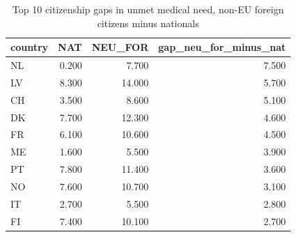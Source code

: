 \begin{table}
\caption{Top 10 citizenship gaps in unmet medical need, non-EU foreign citizens minus nationals}
\label{tab:citizenship_gap}
\begin{tabular}{lrrr}
\toprule
country & NAT & NEU\_FOR & gap\_neu\_for\_minus\_nat \\
\midrule
NL & 0.200 & 7.700 & 7.500 \\
LV & 8.300 & 14.000 & 5.700 \\
CH & 3.500 & 8.600 & 5.100 \\
DK & 7.700 & 12.300 & 4.600 \\
FR & 6.100 & 10.600 & 4.500 \\
ME & 1.600 & 5.500 & 3.900 \\
PT & 7.800 & 11.400 & 3.600 \\
NO & 7.600 & 10.700 & 3.100 \\
IT & 2.700 & 5.500 & 2.800 \\
FI & 7.400 & 10.100 & 2.700 \\
\bottomrule
\end{tabular}
\end{table}
